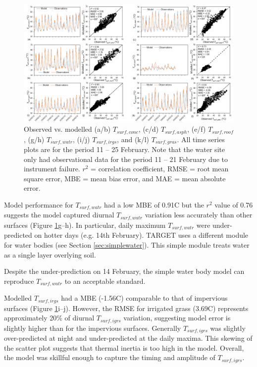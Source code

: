 \documentclass[gmd, manuscript]{copernicus}
\begin{document}
\begin{figure}
\includegraphics[width=1\textwidth]{figure4.png}
\caption{Observed vs. modelled (a/b) $T_{surf,conc}$, (c/d) $ T_{surf,asph}$, (e/f) $T_{surf,roof}$, (g/h) $T_{surf,watr}$, (i/j) $T_{surf,irgs}$, and (k/l)  $T_{surf,gras}$. All time series plots are for the period 11 -- 25 February. Note that the water site only had observational data for the period 11 -- 21 February due to instrument failure. $r^{2}$ = correlation coefficient, RMSE = root mean square error, MBE = mean bias error, and MAE = mean absolute error. }\label{fig:Tsurf_panel}
\end{figure}




Model performance for  $T_{surf,watr}$ had a low MBE of 0.91\degree C but the $r^{2}$ value of 0.76 suggests the model captured diurnal $T_{surf,watr}$  variation less accurately than other surfaces (Figure \ref{fig:Tsurf_panel}g--h). In particular, daily maximum $T_{surf,watr}$ were under-predicted on hotter days (e.g. 14th February). TARGET uses a different module for water bodies (see Section \ref{sec:simplewater}). This simple module treats water as a single layer overlying soil. 
  
Despite the under-prediction on 14 February, the simple water body model can reproduce  $T_{surf,watr}$ to an acceptable standard. 

Modelled $T_{surf,irgs}$ had a MBE (-1.56\degree C) comparable to that of impervious surfaces (Figure \ref{fig:Tsurf_panel}i--j). However, the RMSE for irrigated grass (3.69\degree C) represents approximately 20\% of diurnal $T_{surf,igrs}$ variation, suggesting model error is slightly higher than for the impervious surfaces. Generally  $T_{surf,igrs}$ was slightly over-predicted at night  and under-predicted at the daily maxima. This skewing of the scatter plot suggests that thermal inertia is too high in the model. Overall, the model was skillful enough to capture the timing and amplitude of  $T_{surf,igrs}$. 
\end{document}
